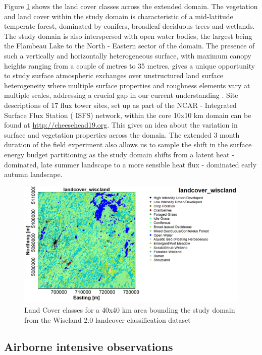 \documentclass[draft]{agujournal2019}
\begin{document}
Figure \ref{fig:land_cover} shows the land cover classes across the extended domain. The vegetation and land cover within the study domain is characteristic of a mid-latitude temperate forest, dominated by conifers, broadleaf deciduous trees and wetlands. The study domain is also interspersed with open water bodies, the largest being the Flambeau Lake to the North - Eastern sector of the domain. The presence of such a vertically and horizontally heterogeneous surface, with maximum canopy heights ranging from a couple of metres to 35 metres, gives a unique opportunity to study surface atmospheric exchanges over unstructured land surface heterogeneity where multiple surface properties and roughness elements vary at multiple scales, addressing a crucial gap in our current understanding \cite{bou-zeid_persistent_2020}. Site descriptions of 17 flux tower sites, set up as part of the NCAR - Integrated Surface Flux Station ( ISFS) network, within the core 10x10 km domain can be found at \url{http://cheesehead19.org}. This gives an idea about the variation in surface and vegetation properties across the domain. The extended 3 month duration of the field experiment also allows us to sample the shift in the surface energy budget partitioning as the study domain shifts from a latent heat - dominated, late summer landscape to a more sensible heat flux - dominated early autumn landscape.
 \begin{figure}[hbtp]
 \noindent\includegraphics[width=\textwidth]{figures_main/land_cover.png}
\caption{Land Cover classes for  a 40x40 km area bounding the study domain from the Wiscland 2.0 landcover classification dataset}
\label{fig:land_cover}
 \end{figure}

\subsection{Airborne intensive observations}
\end{document}
